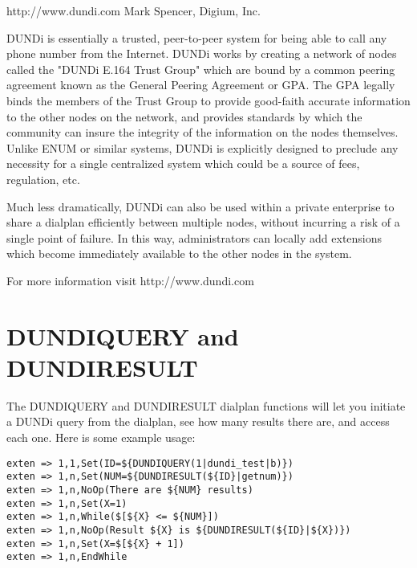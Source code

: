 http://www.dundi.com
Mark Spencer, Digium, Inc.

DUNDi is essentially a trusted, peer-to-peer system for being able to
call any phone number from the Internet.  DUNDi works by creating a
network of nodes called the "DUNDi E.164 Trust Group" which are bound by
a common peering agreement known as the General Peering Agreement or
GPA.  The GPA legally binds the members of the Trust Group to provide
good-faith accurate information to the other nodes on the network, and
provides standards by which the community can insure the integrity of
the information on the nodes themselves.  Unlike ENUM or similar
systems, DUNDi is explicitly designed to preclude any necessity for a
single centralized system which could be a source of fees, regulation,
etc.

Much less dramatically, DUNDi can also be used within a private
enterprise to share a dialplan efficiently between multiple nodes,
without incurring a risk of a single point of failure.  In this way,
administrators can locally add extensions which become immediately
available to the other nodes in the system.

For more information visit http://www.dundi.com

\section{DUNDIQUERY and DUNDIRESULT}

The DUNDIQUERY and DUNDIRESULT dialplan functions will let you initiate
a DUNDi query from the dialplan, see how many results there are, and access
each one.  Here is some example usage:

\begin{verbatim}
exten => 1,1,Set(ID=${DUNDIQUERY(1|dundi_test|b)})
exten => 1,n,Set(NUM=${DUNDIRESULT(${ID}|getnum)})
exten => 1,n,NoOp(There are ${NUM} results)
exten => 1,n,Set(X=1) 
exten => 1,n,While($[${X} <= ${NUM}])
exten => 1,n,NoOp(Result ${X} is ${DUNDIRESULT(${ID}|${X})}) 
exten => 1,n,Set(X=$[${X} + 1])
exten => 1,n,EndWhile
\end{verbatim}

